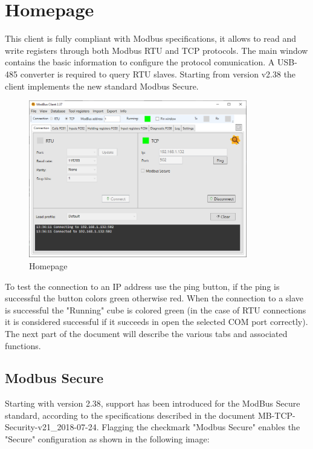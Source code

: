 
\chapter{Homepage}

This client is fully compliant with Modbus specifications,
it allows to read and write registers through both Modbus RTU and TCP protocols.
The main window contains the basic information to configure
the protocol comunication.
A USB-485 converter is required to query RTU slaves.
Starting from version v2.38
the client implements the new standard Modbus Secure.

\begin{figure}[H]
\centering
\includegraphics[width=0.85\textwidth]{../Img/Modbus_Client_Home_00.PNG}
\caption[Homepage]{Homepage}
\end{figure}

To test the connection to an IP address use the ping button,
if the ping is successful the button colors green otherwise red.
When the connection to a slave is successful the "Running" cube is colored
green (in the case of RTU connections it is considered successful if it succeeds in 
open the selected COM port correctly).
The next part of the document will describe the various tabs and associated functions.

\newpage
\section{Modbus Secure}

Starting with version 2.38, support has been introduced for
the ModBus Secure standard, according to the specifications described 
in the document MB-TCP-Security-v21\_2018-07-24.
Flagging the checkmark "Modbus Secure" enables the "Secure" configuration 
as shown in the following image:

